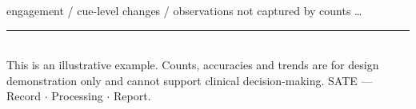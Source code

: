 \documentclass[10pt,a4paper]{article}
\begin{document}
\begin{tcolorbox}[colback=white,colframe=gray!30,boxrule=0.4pt,arc=2pt,
  left=8pt,right=8pt,top=6pt,bottom=6pt,boxsep=0pt,height=1.0cm]
\color{gray!45}\scriptsize\sffamily engagement / cue-level changes / observations not captured by counts \ldots
\end{tcolorbox}

\vfill
{\color{accentlt}\rule{\linewidth}{0.6pt}}\\[1pt]
{\scriptsize\color{black!55}\sffamily This is an illustrative example. Counts, accuracies and trends are for design demonstration only and cannot support clinical decision-making. SATE --- Record $\cdot$ Processing $\cdot$ Report.}
\end{document}
